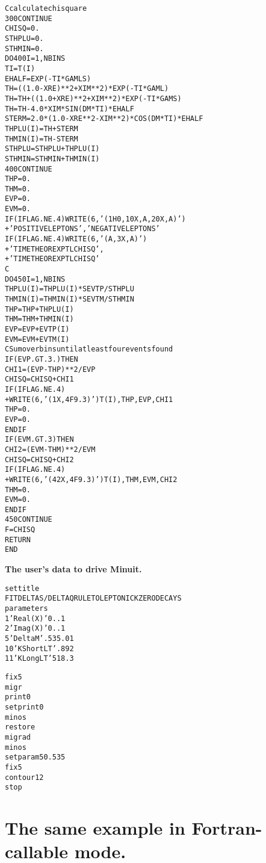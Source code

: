 \begin{alltt}
C                      calculate chisquare
  300 CONTINUE
      CHISQ = 0.
      STHPLU = 0.
      STHMIN = 0.
      DO 400 I= 1, NBINS
      TI = T(I)
      EHALF = EXP(-TI*GAMLS)
      TH =      ((1.0-XRE)**2 + XIM**2) * EXP(-TI*GAML)
      TH = TH + ((1.0+XRE)**2 + XIM**2) * EXP(-TI*GAMS)
      TH = TH -               4.0*XIM*SIN(DM*TI) * EHALF
      STERM = 2.0*(1.0-XRE**2-XIM**2)*COS(DM*TI) * EHALF
      THPLU(I) = TH + STERM
      THMIN(I) = TH - STERM
      STHPLU = STHPLU + THPLU(I)
      STHMIN = STHMIN + THMIN(I)
  400 CONTINUE
      THP = 0.
      THM = 0.
      EVP = 0.
      EVM = 0.
      IF (IFLAG .NE. 4) WRITE (6,'(1H0,10X,A,20X,A)')
     +  'POSITIVE LEPTONS','NEGATIVE LEPTONS'
      IF (IFLAG .NE. 4) WRITE (6,'(A,3X,A)')
     +    '      TIME    THEOR    EXPTL    CHISQ',
     +    '      TIME    THEOR    EXPTL    CHISQ'
C
      DO 450 I= 1, NBINS
      THPLU(I) = THPLU(I)*SEVTP / STHPLU
      THMIN(I) = THMIN(I)*SEVTM / STHMIN
      THP = THP + THPLU(I)
      THM = THM + THMIN(I)
      EVP = EVP + EVTP(I)
      EVM = EVM + EVTM(I)
C  Sum over bins until at least four events found
      IF (EVP .GT. 3.)  THEN
         CHI1 = (EVP-THP)**2/EVP
         CHISQ = CHISQ + CHI1
         IF (IFLAG .NE. 4)
     +      WRITE (6,'(1X,4F9.3)') T(I),THP,EVP,CHI1
         THP = 0.
         EVP = 0.
      ENDIF
      IF (EVM .GT. 3)  THEN
         CHI2 = (EVM-THM)**2/EVM
         CHISQ = CHISQ + CHI2
         IF (IFLAG .NE. 4)
     +      WRITE (6,'(42X,4F9.3)') T(I),THM,EVM,CHI2
         THM = 0.
         EVM = 0.
      ENDIF
  450 CONTINUE
      F = CHISQ
      RETURN
      END
\end{alltt}

\begin{center}\small\textbf{The user's data to drive Minuit.}\end{center}

\begin{alltt}\footnotesize
set title
FIT DELTA S/ DELTA Q RULE TO LEPTONIC K ZERO DECAYS
parameters
1 'Real(X)' 0. .1
2 'Imag(X)' 0. .1
5 'Delta M'  .535 .01
10 'K Short LT' .892
11 'K Long LT'   518.3
 
fix 5
migr
print 0
set print 0
minos
restore
migrad
minos
set param 5 0.535
fix 5
contour 1 2
stop
\end{alltt}

\section{The same example in Fortran-callable mode.}

